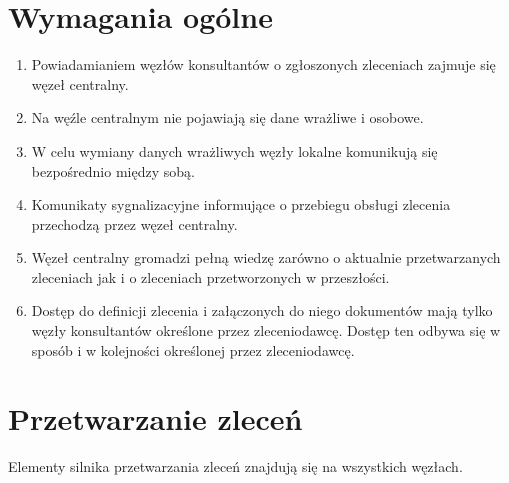\documentclass[a4paper]{report}
\begin{document}
\section{Wymagania ogólne}
\begin{enumerate}
\item Powiadamianiem węzłów konsultantów o zgłoszonych zleceniach zajmuje się węzeł centralny.
\item Na węźle centralnym nie pojawiają się dane wrażliwe i osobowe.
\item W celu wymiany danych wrażliwych węzły lokalne komunikują się bezpośrednio między sobą.
\item Komunikaty sygnalizacyjne informujące o przebiegu obsługi zlecenia przechodzą przez węzeł centralny.
\item Węzeł centralny gromadzi pełną wiedzę zarówno o aktualnie przetwarzanych zleceniach jak i o zleceniach przetworzonych w przeszłości.
\item Dostęp do definicji zlecenia i załączonych do niego dokumentów mają tylko węzły konsultantów określone przez zleceniodawcę. Dostęp ten odbywa się w sposób i w kolejności określonej przez zleceniodawcę.
\end{enumerate}

\section{Przetwarzanie zleceń}

Elementy silnika przetwarzania zleceń znajdują się na wszystkich węzłach.
\end{document}
